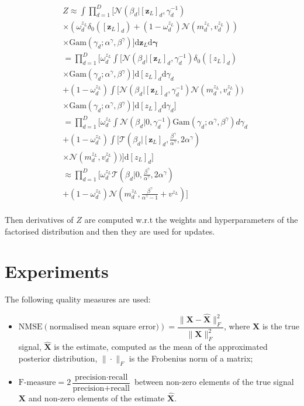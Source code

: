 \documentclass[letterpaper]{article}
\begin{document}
\begin{align}
\begin{split}
&Z \approx \int \prod_{d=1}^{D} \big[\mathcal{N}(\beta_d | [\mathbf{z}_L]_d, \gamma_d^{-1}) \\
&\times (\omega^{z_L}_d \delta_0([\mathbf{z}_L]_d) + (1 - \omega^{z_L}_d)\mathcal{N}(m^{z_L}_d, v^{z_L}_d))\\
&\times \text{Gam} (\gamma_d; \alpha^\gamma, \beta^\gamma)\big]\mathrm{d}\mathbf{z}_L \mathrm{d}\boldsymbol\gamma \\
&= \prod_{d=1}^{D} \Big[\omega^{z_L}_d \int \big[\mathcal{N}(\beta_d | [\mathbf{z}_L]_d, \gamma_d^{-1})  \delta_0([z_L]_d) \\
&\times \text{Gam} (\gamma_d; \alpha^\gamma, \beta^\gamma)\big]\mathrm{d}[{z}_L]_d \mathrm{d}\gamma_d \\
& + (1 - \omega^{z_L}_d)\int \big[\mathcal{N}(\beta_d | [\mathbf{z}_L]_d, \gamma_d^{-1})\mathcal{N}(m^{z_L}_d, v^{z_L}_d)) \\
&\times \text{Gam} (\gamma_d; \alpha^\gamma, \beta^\gamma)\big]\mathrm{d}[{z}_L]_d \mathrm{d}\gamma_d\Big] \\
& = \prod_{d=1}^{D} \Big[\omega^{z_L}_d \int \mathcal{N}(\beta_d | 0, \gamma_d^{-1})  \text{Gam} (\gamma_d; \alpha^\gamma, \beta^\gamma) d\gamma_d \\
& + (1 - \omega^{z_L}_d)\int \big[\mathcal{T}(\beta_d | [\mathbf{z}_L]_d, \frac{\beta^\gamma}{\alpha^\gamma}, 2\alpha^\gamma) \\
&\times \mathcal{N}(m^{z_L}_d, v^{z_L}_d))\big] \mathrm{d}[{z}_L]_d\Big] \\
& \approx \prod_{d=1}^D \Big[\omega^{z_L}_d  \mathcal{T}(\beta_d | 0, \frac{\beta^\gamma}{\alpha^\gamma}, 2\alpha^\gamma) \\
&+ (1 - \omega^{z_L}_d)\mathcal{N}(m^{z_L}_d, \frac{\beta^\gamma}{\alpha^\gamma - 1} + v^{z_L})\Big]
\end{split}
\end{align}

Then derivatives of $Z$ are computed w.r.t the weights and hyperparameters of the factorised distribution and then they are used for updates.

\section{Experiments}

The following quality measures are used:
\begin{itemize}
\item $\text{NMSE} (\text{normalised mean square error)})= \dfrac{\|\mathbf{X} - \widehat{\mathbf{X}}\|^2_{F}}{\|\mathbf{X}\|^2_{F}}$, where $\mathbf{X}$ is the true signal, $\widehat{\mathbf{X}}$ is the estimate, computed as the mean of the approximated posterior distribution, $\|\cdot\|_{F}$ is the Frobenius norm of a matrix;
\item $\text{F-measure} = 2\dfrac{\text{precision}\cdot\text{recall}}{\text{precision} + \text{recall}}$ between non-zero elements of the true signal $\mathbf{X}$ and non-zero elements of the estimate $\widehat{\mathbf{X}}$. 
\end{itemize}
\end{document}
